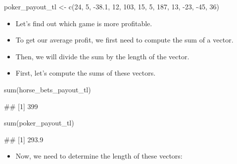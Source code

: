 \documentclass[
]{book}
\newenvironment{Shaded}{\begin{snugshade}}{\end{snugshade}}
\newcommand{\DecValTok}[1]{\textcolor[rgb]{0.00,0.00,0.81}{#1}}
\newcommand{\FloatTok}[1]{\textcolor[rgb]{0.00,0.00,0.81}{#1}}
\newcommand{\FunctionTok}[1]{\textcolor[rgb]{0.00,0.00,0.00}{#1}}
\newcommand{\NormalTok}[1]{#1}
\newcommand{\OtherTok}[1]{\textcolor[rgb]{0.56,0.35,0.01}{#1}}
\newcommand{\SpecialCharTok}[1]{\textcolor[rgb]{0.00,0.00,0.00}{#1}}
\providecommand{\tightlist}{%
  \setlength{\itemsep}{0pt}\setlength{\parskip}{0pt}}
\begin{document}
\begin{Shaded}
\begin{Highlighting}[]
\NormalTok{poker\_payout\_tl }\OtherTok{\textless{}{-}} \FunctionTok{c}\NormalTok{(}\DecValTok{24}\NormalTok{, }\DecValTok{5}\NormalTok{, }\SpecialCharTok{{-}}\FloatTok{38.1}\NormalTok{, }\DecValTok{12}\NormalTok{, }\DecValTok{103}\NormalTok{, }\DecValTok{15}\NormalTok{, }\DecValTok{5}\NormalTok{, }\DecValTok{187}\NormalTok{, }\DecValTok{13}\NormalTok{, }\SpecialCharTok{{-}}\DecValTok{23}\NormalTok{, }\SpecialCharTok{{-}}\DecValTok{45}\NormalTok{, }\DecValTok{36}\NormalTok{)}
\end{Highlighting}
\end{Shaded}

\begin{itemize}
\tightlist
\item
  Let's find out which game is more profitable.
\item
  To get our average profit, we first need to compute the sum of a vector.
\item
  Then, we will divide the sum by the length of the vector.
\item
  First, let's compute the sums of these vectors.
\end{itemize}

\begin{Shaded}
\begin{Highlighting}[]
\FunctionTok{sum}\NormalTok{(horse\_bets\_payout\_tl)}
\end{Highlighting}
\end{Shaded}

\begin{Shaded}
\begin{Highlighting}[]
\NormalTok{\#\# [1] 399}
\end{Highlighting}
\end{Shaded}

\begin{Shaded}
\begin{Highlighting}[]
\FunctionTok{sum}\NormalTok{(poker\_payout\_tl)}
\end{Highlighting}
\end{Shaded}

\begin{Shaded}
\begin{Highlighting}[]
\NormalTok{\#\# [1] 293.9}
\end{Highlighting}
\end{Shaded}

\begin{itemize}
\tightlist
\item
  Now, we need to determine the length of these vectors:
\end{itemize}
\end{document}
